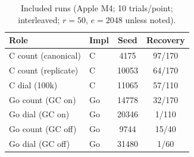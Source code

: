 \documentclass[11pt]{article}
\begin{document}
\begin{table}[t]
\centering
\caption{Included runs (Apple M4; 10 trials/point; interleaved; $r{=}50$,
$e{=}2048$ unless noted).}
\label{tab:prov}
\begin{tabular}{llcc}
\toprule
Role & Impl & Seed & Recovery \\
\midrule
C count (canonical)  & C  & 4175  & 97/170 \\
C count (replicate)  & C  & 10053 & 64/170 \\
C dial (100k)        & C  & 11065 & 57/110 \\
Go count (GC on)     & Go & 14778 & 32/170 \\
Go dial (GC on)      & Go & 20346 & 1/110  \\
Go count (GC off)    & Go & 9744  & 15/40  \\
Go dial (GC off)     & Go & 31480 & 1/60   \\
\bottomrule
\end{tabular}
\end{table}



\end{document}
